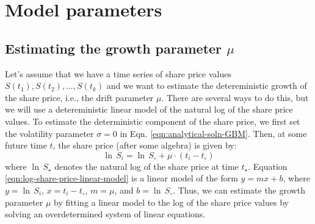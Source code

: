 \documentclass[11pt]{article}
\theoremstyle{definition}
\begin{document}
\section*{Model parameters}
\subsection*{Estimating the growth parameter $\mu$}
Let's assume that we have a time series of share price values $S(t_{1}), S(t_{2}), \dots, S(t_{k})$ and we want to estimate the detereministic growth of the share price, i.e., the drift parameter $\mu$.
There are several ways to do this, but we will use a detereministic linear model of the natural log of the share price values.
To estimate the deterministic component of the share price, we first set the volatility parameter $\sigma = 0$ in Eqn. \ref{eqn:analytical-soln-GBM}.
Then, at some future time $t$, the share price (after some algebra) is given by:
\begin{equation}\label{eqn:log-share-price-linear-model}
\ln\,S_{i} = \ln\,S_{\circ} + \mu\cdot\left(t_{i}-t_{\circ}\right)
\end{equation}
where $\ln\,S_{\star}$ denotes the natural log of the share price at time $t_{\star}$.
Equation \ref{eqn:log-share-price-linear-model} is a linear model of the form $y = mx + b$, where $y = \ln\,S_{i}$, $x = t_{i}-t_{\circ}$, $m = \mu$, and $b = \ln\,S_{\circ}$.
Thus, we can estimate the growth parameter $\mu$ by fitting a linear model to the log of the share price values by solving an overdetermined system of linear equations.
\end{document}
